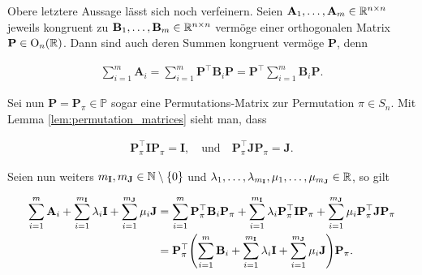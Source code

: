                 \begin{remark} \label{rem:congruent_sums}
                    
                    Obere letztere Aussage lässt sich noch verfeinern.
                    Seien $\mathbf A_1, \dots, \mathbf A_m \in \mathbb R^{n \times n}$ jeweils kongruent zu $\mathbf B_1, \dots, \mathbf B_m \in \mathbb R^{n \times n}$ vermöge einer orthogonalen Matrix $\mathbf P \in \operatorname O_n(\mathbb R)$.
                    Dann sind auch deren Summen kongruent vermöge $\mathbf P$, denn

                    \begin{align*}
                        \sum_{i=1}^m \mathbf A_i
                        =
                        \sum_{i=1}^m \mathbf P^\top \mathbf B_i \mathbf P
                        =
                        \mathbf P^\top \sum_{i=1}^m \mathbf B_i \mathbf P.
                    \end{align*}

                    Sei nun $\mathbf P = \mathbf P_\pi \in \mathbb P$ sogar eine Permutations-Matrix zur Permutation $\pi \in S_n$.
                    Mit Lemma \ref{lem:permutation_matrices} sieht man, dass

                    \begin{align*}
                        \mathbf P_\pi^\top \mathbf I \mathbf P_\pi = \mathbf I,
                        \quad
                        \text{und}
                        \quad
                        \mathbf P_\pi^\top \mathbf J \mathbf P_\pi = \mathbf J.
                    \end{align*}

                    Seien nun weiters $m_\mathbf{I}, m_\mathbf{J} \in \mathbb N \setminus {\left \{ 0 \right \}}$ und $\lambda_1, \dots, \lambda_{m_\mathbf{I}}, \mu_1, \dots, \mu_{m_\mathbf{J}} \in \mathbb R$, so gilt

                    \begin{align*}
                        \sum_{i=1}^m \mathbf A_i
                        +
                        \sum_{i=1}^{m_\mathbf{I}} \lambda_i \mathbf I
                        +
                        \sum_{i=1}^{m_\mathbf{J}} \mu_i \mathbf J
                        & =
                        \sum_{i=1}^m \mathbf P_\pi^\top \mathbf B_i \mathbf P_\pi
                        +
                        \sum_{i=1}^{m_\mathbf{I}} \lambda_i \mathbf P_\pi^\top \mathbf I \mathbf P_\pi
                        +
                        \sum_{i=1}^{m_\mathbf{J}} \mu_i \mathbf P_\pi^\top \mathbf J \mathbf P_\pi \\
                        & =
                        \mathbf P_\pi^\top
                        {\left ( 
                            \sum_{i=1}^m \mathbf B_i
                            +
                            \sum_{i=1}^{m_\mathbf{I}} \lambda_i \mathbf I
                            +
                            \sum_{i=1}^{m_\mathbf{J}} \mu_i \mathbf J
                         \right )}
                        \mathbf P_\pi.
                    \end{align*}

                \end{remark}

